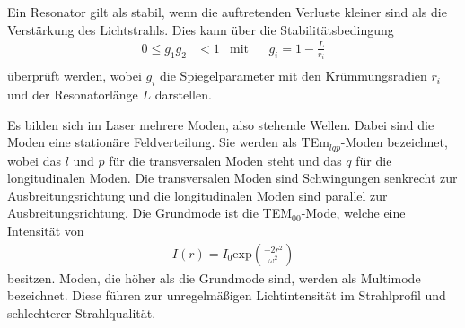 Ein Resonator gilt als stabil, wenn die auftretenden Verluste kleiner sind als die Verstärkung des Lichtstrahls.
Dies kann über die Stabilitätsbedingung
\begin{align}
    0 \leq g_1 g_2 &< 1 & \text{mit}& & g_i = 1 - \frac{L}{r_i}\\
    \label{eqn:Stabilitätsbedingung}
\end{align}
überprüft werden, wobei $g_i$ die Spiegelparameter mit den Krümmungsradien $r_i$ und der Resonatorlänge $L$ darstellen.

Es bilden sich im Laser mehrere Moden, also stehende Wellen. Dabei sind die Moden eine stationäre Feldverteilung. Sie werden als TEm$_{lqp}$-Moden bezeichnet, wobei das $l$ und $p$ für die 
transversalen Moden steht und das $q$ für die longitudinalen Moden. Die transversalen Moden sind Schwingungen senkrecht zur Ausbreitungsrichtung und die longitudinalen Moden sind parallel zur 
Ausbreitungsrichtung. Die Grundmode ist die TEM$_{00}$-Mode, welche eine Intensität von 
\begin{align*}
    I(r) = I_0 \text{exp}(\frac{-2r^2}{\omega^2})
\end{align*}
besitzen. Moden, die höher als die Grundmode sind, werden als Multimode bezeichnet. Diese führen zur unregelmäßigen Lichtintensität im Strahlprofil und schlechterer Strahlqualität.




